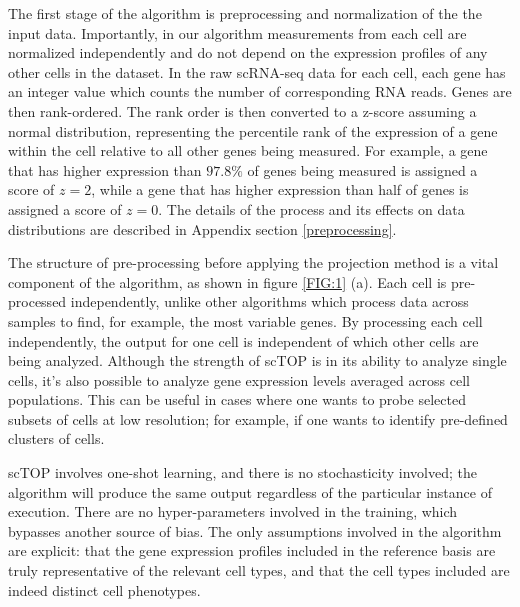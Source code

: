 \documentclass[aps,superscriptaddress, notitlepage,longbibliography]{revtex4-1}
\begin{document}
The first stage of the algorithm is preprocessing and normalization of the the input data. Importantly, in our algorithm measurements from each cell are normalized independently and do not depend on the expression profiles of any other cells in the dataset. In the raw scRNA-seq data for each cell, each gene has an integer value which counts the number of corresponding RNA reads. Genes are then rank-ordered. The rank order is then converted to a z-score assuming a normal distribution, representing the percentile rank of the expression of a gene within the cell relative to all other genes being measured. For example, a gene that has higher expression than $97.8\%$ of genes being measured is assigned a score of $z=2$, while a gene that has higher expression than half of genes is assigned a score of $z=0$. The details of the process and its effects on data distributions are described in Appendix section \ref{preprocessing}.

The structure of pre-processing before applying the projection method is a vital component of the algorithm, as shown in figure \ref{FIG:1} (a). Each cell is pre-processed independently, unlike other algorithms which process data across samples to find, for example, the most variable genes. By processing each cell independently, the output for one cell is independent of which other cells are being analyzed. Although the strength of scTOP is in its ability to analyze single cells, it's also possible to analyze gene expression levels averaged across cell populations. This can be useful in cases where one wants to probe selected subsets of cells at low resolution; for example, if one wants to identify pre-defined clusters of cells.

scTOP involves one-shot learning, and there is no stochasticity involved; the algorithm will produce the same output regardless of the particular instance of execution. There are no hyper-parameters involved in the training, which bypasses another source of bias. The only assumptions involved in the algorithm are explicit: that the gene expression profiles included in the reference basis are truly representative of the relevant cell types, and that the cell types included are indeed distinct cell phenotypes. 
\end{document}
